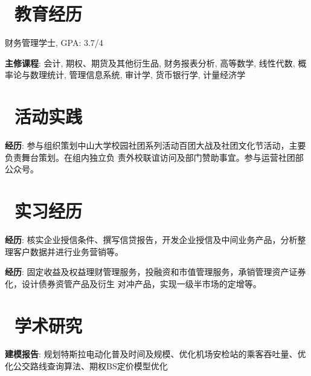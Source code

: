 \documentclass[10pt]{resume}
\begin{document}


\section{\faGraduationCap\ 教育经历}
财务管理学士, GPA: 3.7/4

\textbf{主修课程}: 会计, 期权、期货及其他衍生品, 财务报表分析, 高等数学,
线性代数, 概率论与数理统计, 管理信息系统, 审计学, 货币银行学, 计量经济学

\section{\faUsers\ 活动实践}

\textbf{经历}: 参与组织策划中山大学校园社团系列活动百团大战及社团文化节活动，主要负责舞台策划。在组内独立负
责外校联谊访问及部门赞助事宜。参与运营社团部公众号。


\section{\faCogs\ 实习经历}

\textbf{经历}: 核实企业授信条件、撰写信贷报告，开发企业授信及中间业务产品，分析整理客户数据并进行业务营销等。


\textbf{经历}: 固定收益及权益理财管理服务，投融资和市值管理服务，承销管理资产证券化，设计债券资管产品及衍生
对冲产品，实现一级半市场的定增等。


\section{\faFlask\ 学术研究}
\textbf{建模报告}: 规划特斯拉电动化普及时间及规模、优化机场安检站的乘客吞吐量、优化公交路线查询算法、期权BS定价模型优化
\end{document}
